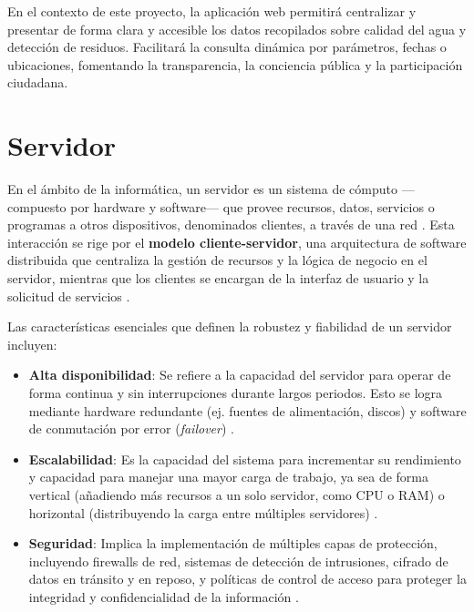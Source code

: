 En el contexto de este proyecto, la aplicación web permitirá centralizar y presentar de forma clara y accesible los datos recopilados sobre calidad del agua y detección de residuos. Facilitará la consulta dinámica por parámetros, fechas o ubicaciones, fomentando la transparencia, la conciencia pública y la participación ciudadana.

\section{Servidor}

En el ámbito de la informática, un servidor es un sistema de cómputo —compuesto por hardware y software— que provee recursos, datos, servicios o programas a otros dispositivos, denominados clientes, a través de una red \cite{Espana2003}. Esta interacción se rige por el \textbf{modelo cliente-servidor}, una arquitectura de software distribuida que centraliza la gestión de recursos y la lógica de negocio en el servidor, mientras que los clientes se encargan de la interfaz de usuario y la solicitud de servicios \cite{Britannica2024}.

Las características esenciales que definen la robustez y fiabilidad de un servidor incluyen:

\begin{itemize}
    \item \textbf{Alta disponibilidad}: Se refiere a la capacidad del servidor para operar de forma continua y sin interrupciones durante largos periodos. Esto se logra mediante hardware redundante (ej. fuentes de alimentación, discos) y software de conmutación por error (\textit{failover}) \cite{Stanek2014}.
    \item \textbf{Escalabilidad}: Es la capacidad del sistema para incrementar su rendimiento y capacidad para manejar una mayor carga de trabajo, ya sea de forma vertical (añadiendo más recursos a un solo servidor, como CPU o RAM) o horizontal (distribuyendo la carga entre múltiples servidores) \cite{Mancera2015}.
    \item \textbf{Seguridad}: Implica la implementación de múltiples capas de protección, incluyendo firewalls de red, sistemas de detección de intrusiones, cifrado de datos en tránsito y en reposo, y políticas de control de acceso para proteger la integridad y confidencialidad de la información \cite{Espana2003}.
\end{itemize}

